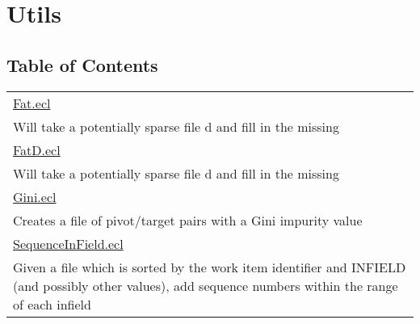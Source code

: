 \chapter*{Utils}
\hypertarget{ecldoc:toc:ML_Core/Utils}{}


\section*{Table of Contents}
{\renewcommand{\arraystretch}{1.5}
\begin{longtable}{|p{\textwidth}|}
\hline
\hyperlink{ecldoc:toc:ML_Core.Utils.Fat}{Fat.ecl} \\
Will take a potentially sparse file d and fill in the missing \\
\hline
\hyperlink{ecldoc:toc:ML_Core.Utils.FatD}{FatD.ecl} \\
Will take a potentially sparse file d and fill in the missing \\
\hline
\hyperlink{ecldoc:toc:ML_Core.Utils.Gini}{Gini.ecl} \\
Creates a file of pivot/target pairs with a Gini impurity value \\
\hline
\hyperlink{ecldoc:toc:ML_Core.Utils.SequenceInField}{SequenceInField.ecl} \\
Given a file which is sorted by the work item identifier and INFIELD (and possibly other values), add sequence numbers within the range of each infield \\
\hline
\end{longtable}
}





